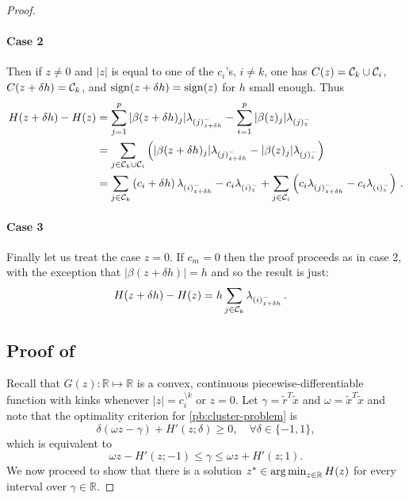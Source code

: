 \begin{proof}
  \paragraph{Case 2}
  Then if  $z \neq 0$ and $|z|$ is equal to one of the $c_i$'s, $i \neq k$,  one has $C(z) = \mathcal{C}_k \cup \mathcal{C}_i$, $C(z + \delta h) = \mathcal{C}_k$, and $\operatorname{sign}(z + \delta h) = \operatorname{sign}(z)$ for $h$ small enough.
  Thus
  \begin{align}
    H(z + \delta h) - H(z)
      &= \sum_{j =1}^p |\beta(z + \delta h)_j| \lambda_{(j)^-_{z + \delta h}}
          - \sum_{i=1}^p |\beta(z)_j| \lambda_{(j)^-_z}  \nonumber \\
      &= \sum_{j \in \mathcal{C}_k \cup \mathcal{C}_i} \left( |\beta(z + \delta h)_j| \lambda_{(j)^-_{z + \delta h}}
         - |\beta(z)_j| \lambda_{(j)^-_z} \right)  \nonumber \\
      &= \sum_{j \in \mathcal{C}_k} \left( c_i + \delta h \right) \lambda_{(i)^-_{z + \delta h}}
           - c_i \lambda_{(i)^-_z}
           + \sum_{j \in \mathcal{C}_i} \left( c_i \lambda_{(j)^-_{z + \delta h}}
           - c_i \lambda_{(i)^-_z} \right) \, .
  \end{align}

  \paragraph{Case 3} Finally let us treat the case $z = 0$.
  If $c_m = 0$ then the proof proceeds as in case 2, with the exception that $|\beta(z + \delta h)| = h$ and so the result is just:
  \begin{align}
    H(z + \delta h) - H(z)
      &= h \sum_{j \in \mathcal{C}_k} \lambda_{(i)^-_{z + \delta h}} \, .
  \end{align}
\subsection{Proof of }

Recall that \(G(z) : \mathbb{R} \mapsto \mathbb{R}\) is a convex,
continuous piecewise-differentiable function with kinks whenever \(|z| =
c_i^{\setminus k}\) or \(z = 0\). Let \(\gamma = \tilde{r}^T\tilde{x}\)
and \(\omega = \tilde{x}^T\tilde{x}\) and note that the optimality criterion for
\eqref{pb:cluster-problem} is
\[
  \delta(\omega z - \gamma) + H'(z; \delta) \geq 0, \quad
  \forall \delta \in \{-1, 1\},
\]
which is equivalent to
\begin{equation}
  \label{eq:optimality-inequality}
  \omega z - H'(z; -1) \leq \gamma \leq \omega z + H'(z; 1).
\end{equation}
We now proceed to show that there is a solution \(z^* \in \operatorname*{arg\,min}_{z \in
  \mathbb{R}} H(z)\) for every interval over \(\gamma \in \mathbb{R}\).


\end{proof}
